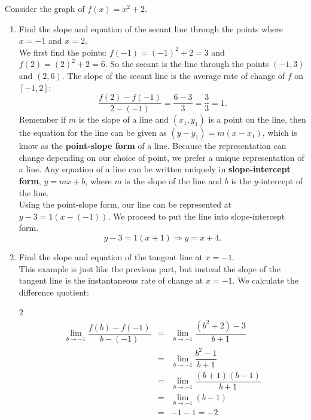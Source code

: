 \documentclass{book}
\begin{document}
\begin{Exam} Consider the graph of $f(x) = x^2+2$.
\begin{enumerate}
\item Find the slope and equation of the secant line through the points where $x=-1$ and $x=2$.\\

We first find the points: $f(-1) = (-1)^2+2 = 3$ and $f(2) = (2)^2+2 = 6$. So the secant is the line through the points $(-1,3)$ and $(2,6)$. The slope of the secant line is the average rate of change of $f$ on $[-1,2]$:
\[\dfrac{f(2)-f(-1)}{2-(-1)} = \dfrac{6-3}{3} = \dfrac{3}{3} = 1.\] Remember if $m$ is the slope of a line and $(x_1,y_1)$ is a point on the line, then the equation for the line can be given as $(y-y_1) = m(x-x_1)$, which is know as the \textbf{point-slope form} of a line. Because the representation can change depending on our choice of point, we prefer a unique representation of a line. Any equation of a line can be written uniquely in \textbf{slope-intercept form}, $y=mx+b$, where $m$ is the slope of the line and $b$ is the $y$-intercept of the line.\\

Using the point-slope form, our line can be represented at $y-3 = 1(x-(-1))$. We proceed to put the line into slope-intercept form. \[y-3 = 1(x+1) \Rightarrow y = x+4.\]

\item Find the slope and equation of the tangent line at $x=-1$.\\

This example is just like the previous part, but instead the slope of the tangent line is the instantaneous rate of change at $x=-1$. We calculate the difference quotient:\vspace{-15pt}

\begin{multicols}{2}
\begin{eqnarray*}
\lim_{b\to -1} \dfrac{f(b) - f(-1)}{b-(-1)} &=& \lim_{b\to -1} \dfrac{(b^2+2) - 3}{b+1}\\ &=& \lim_{b\to -1} \dfrac{b^2-1}{b+1}\\
&=& \lim_{b\to -1} \dfrac{(b+1)(b-1)}{b+1}\\ &=&  \lim_{b\to -1} (b-1)\\
&=& -1-1 = -2
\end{eqnarray*} \columnbreak

\end{multicols}\vspace{-25pt}


\end{enumerate}
\end{Exam}
\end{document}
